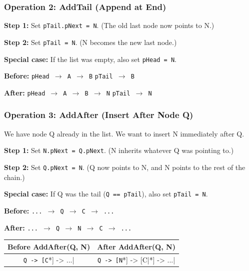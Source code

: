\documentclass[12pt,portrait]{article}
\begin{document}
\subsubsection{Operation 2: AddTail (Append at End)}

\begin{rulebox}
\textbf{Step 1:} Set \texttt{pTail.pNext = N}. (The old last node now points to N.)

\textbf{Step 2:} Set \texttt{pTail = N}. (N becomes the new last node.)

\textbf{Special case:} If the list was empty, also set \texttt{pHead = N}.

\textbf{Before:} \texttt{pHead $\to$ A $\to$ B} \quad \texttt{pTail $\to$ B}

\textbf{After:} \texttt{pHead $\to$ A $\to$ B $\to$ N} \quad \texttt{pTail $\to$ N}
\end{rulebox}

\subsubsection{Operation 3: AddAfter (Insert After Node Q)}

\begin{rulebox}
We have node Q already in the list. We want to insert N immediately after Q.

\textbf{Step 1:} Set \texttt{N.pNext = Q.pNext}. (N inherits whatever Q was pointing to.)

\textbf{Step 2:} Set \texttt{Q.pNext = N}. (Q now points to N, and N points to the rest of the chain.)

\textbf{Special case:} If Q was the tail (\texttt{Q == pTail}), also set \texttt{pTail = N}.

\textbf{Before:} \texttt{... $\to$ Q $\to$ C $\to$ ...}

\textbf{After:} \texttt{... $\to$ Q $\to$ N $\to$ C $\to$ ...}
\end{rulebox}

\begin{center}
\begin{tabular}{c|c}
\toprule
\textbf{Before AddAfter(Q, N)} & \textbf{After AddAfter(Q, N)} \\
\midrule
\verb|Q -> [C|*] -> ...| & \verb|Q -> [N|*] -> [C|*] -> ...| \\
\bottomrule
\end{tabular}
\end{center}
\end{document}
